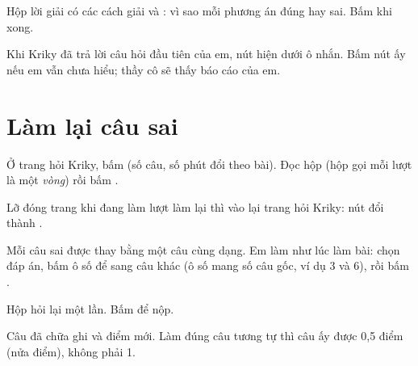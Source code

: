 
Hộp lời giải có các cách giải và : vì sao mỗi phương án đúng hay sai. Bấm
 khi xong.


Khi Kriky đã trả lời câu hỏi đầu tiên của em, nút  hiện dưới ô
nhắn. Bấm nút ấy nếu em vẫn chưa hiểu; thầy cô sẽ thấy báo cáo của em.



\chapter{Làm lại câu sai}
\label{chuong:lam-lai}



Ở trang hỏi Kriky, bấm  (số câu, số phút đổi theo bài). Đọc hộp
 (hộp gọi mỗi lượt là một \emph{vòng}) rồi bấm  .

Lỡ đóng trang khi đang làm lượt làm lại thì vào lại trang hỏi Kriky: nút đổi thành .




Mỗi câu sai được thay bằng một câu cùng dạng. Em làm như lúc làm bài: chọn đáp án, bấm ô số để sang câu
khác (ô số mang số câu gốc, ví dụ 3 và 6), rồi bấm .


Hộp  hỏi lại một lần. Bấm  để nộp.




Câu đã chữa ghi  và điểm mới. Làm đúng câu tương tự thì câu ấy được 0,5 điểm (nửa
điểm), không phải 1.

